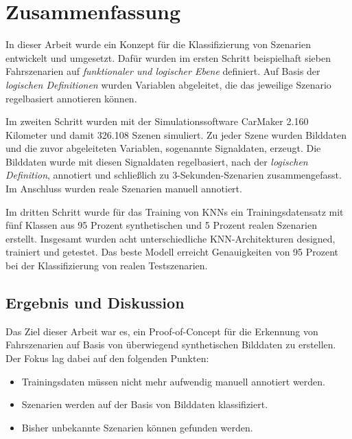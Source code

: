 
\chapter{Zusammenfassung}
\label{zusammenfassung}

In dieser Arbeit wurde ein Konzept für die Klassifizierung von Szenarien entwickelt und umgesetzt. Dafür wurden im ersten Schritt beispielhaft sieben Fahrszenarien auf \textit{funktionaler und logischer Ebene} definiert. Auf Basis der \textit{logischen Definitionen} wurden Variablen abgeleitet, die das jeweilige Szenario regelbasiert annotieren können. 

Im zweiten Schritt wurden mit der Simulationssoftware CarMaker 2.160 Kilometer und damit 326.108 Szenen simuliert. Zu jeder Szene wurden Bilddaten und die zuvor abgeleiteten Variablen, sogenannte Signaldaten, erzeugt. Die Bilddaten wurde mit diesen Signaldaten regelbasiert, nach der \textit{logischen Definition}, annotiert und schließlich zu 3-Sekunden-Szenarien zusammengefasst. Im Anschluss wurden reale Szenarien manuell annotiert.

Im dritten Schritt wurde für das Training von \acp{KNN} ein Trainingsdatensatz mit fünf Klassen aus 95 Prozent synthetischen und 5 Prozent realen Szenarien erstellt. Insgesamt wurden acht unterschiedliche \ac{KNN}-Architekturen designed, trainiert und getestet. Das beste Modell erreicht Genauigkeiten von 95 Prozent bei der Klassifizierung von realen Testszenarien.

\section{Ergebnis und Diskussion}
\label{zusammenfassung_ergebnis}

Das Ziel dieser Arbeit war es, ein Proof-of-Concept für die Erkennung von Fahrszenarien auf Basis von überwiegend synthetischen Bilddaten zu erstellen. Der Fokus lag dabei auf den folgenden Punkten:

\begin{itemize}
\item Trainingsdaten müssen nicht mehr aufwendig manuell annotiert werden.
\item Szenarien werden auf der Basis von Bilddaten klassifiziert.
\item Bisher unbekannte Szenarien können gefunden werden.
\end{itemize}

